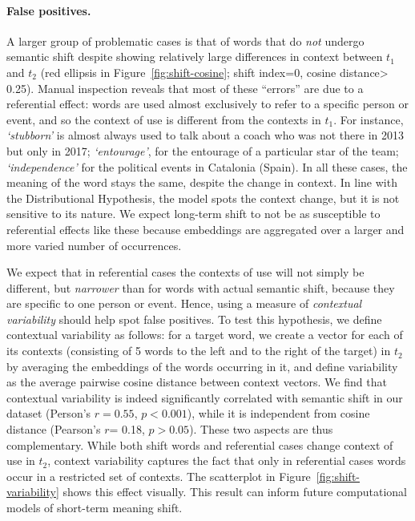 \paragraph{False positives.}
A larger group of problematic cases is that of %
words that do \textit{not} undergo semantic shift despite showing
relatively large differences in context between $t_1$ and $t_2$ (red ellipsis in
Figure~\ref{fig:shift-cosine}; shift index=0, cosine distance\textgreater	
0.25). Manual inspection reveals that most of these ``errors'' 
are due to a referential effect: words are used
almost exclusively to refer to a specific person or event, and
so the context of use is different from the contexts in $t_1$.
For instance, {\em `stubborn'} is
almost always used to talk about a coach who was not
there in 2013 but only in 2017; 
{\em `entourage'}, for the entourage of a particular star of the team; {\em `independence'} for the
political events in Catalonia (Spain). 
In all these cases, the meaning of the word stays the same, %
despite the change in context. In line with the Distributional
Hypothesis, the model spots the context change, but it is not
sensitive to its nature. We expect long-term shift to not be as
susceptible to referential effects 
like these because
embeddings are aggregated over a larger and more varied number of
occurrences.

We expect that in referential cases the contexts of use will not
simply be different, but \textit{narrower} than for words with actual
semantic shift, because they are specific to one person or
event. Hence, using a measure of \textit{contextual variability}
should help spot false positives.  To test this hypothesis, we define
contextual variability as follows: for a target word, we create a
vector for each of its contexts (consisting of 5 words to the left and
to the right of the target) in $t_2$ by averaging the embeddings of
the words occurring in it, and define variability as the average
pairwise cosine distance between context vectors.  We find that
contextual variability is indeed significantly correlated with
semantic shift in our dataset (Person's $r\!=\!0.55$, $p\!<\!0.001$),
while it is independent from cosine distance (Pearson's $r$= 0.18,
$p> 0.05$). These two aspects are thus complementary. While both shift
words and referential cases change context of use in $t_2$, context
variability captures the fact that only in referential cases words
occur in a restricted set of contexts. The scatterplot in
Figure~\ref{fig:shift-variability} shows this effect visually.  This
result can inform future computational models of short-term meaning
shift.


